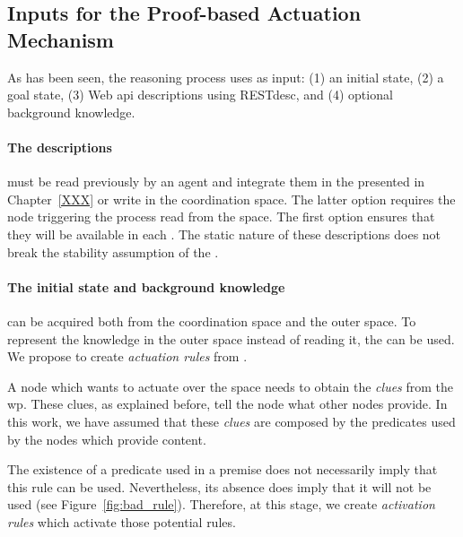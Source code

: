 \subsection{Inputs for the Proof-based Actuation Mechanism}
\label{sec:inputs_proof}

As has been seen, the reasoning process uses as input:
(1) an initial state,
(2) a goal state,
(3) Web \ac{api} descriptions using RESTdesc, and
(4) optional background knowledge.


\paragraph{The descriptions} must be read previously by an agent and integrate them in the \clues{} presented in Chapter~\ref{XXX} or write in the coordination space.
The latter option requires the node triggering the process read from the space.
The first option ensures that they will be available in each \consumer{}.
The static nature of these descriptions does not break the stability assumption of the \clues{}.


\paragraph{The initial state and background knowledge} can be acquired both from the coordination space and the outer space.
To represent the knowledge in the outer space instead of reading it, the \clues{} can be used.
We propose to create \emph{actuation rules} from \clues{}.


A node which wants to actuate over the space needs to obtain the \emph{clues} from the \ac{wp}.
These clues, as explained before, tell the node what other nodes provide.
In this work, we have assumed that these \emph{clues} are composed by the predicates used by the nodes which provide content.


The existence of a predicate used in a premise does not necessarily imply that this rule can be used.
Nevertheless, its absence does imply that it will not be used (see Figure~\ref{fig:bad_rule}).
Therefore, at this stage, we create \emph{activation rules} which activate those potential rules. %


